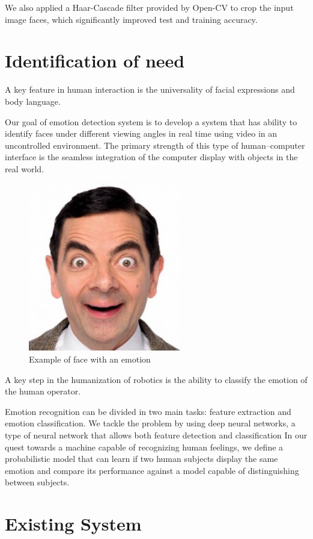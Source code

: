 We also applied a Haar-Cascade filter provided by Open-CV to crop the input image faces, which significantly improved test and training accuracy.

\section{Identification of need}
A key feature in human interaction is the universality of facial expressions and body language.

Our goal of emotion detection system is to develop a system that has ability to identify faces under different viewing angles in real time using video in an uncontrolled environment. The primary strength of this type of human–computer interface is the seamless integration of the computer display with objects in the real world.

\begin{figure}[h]
	\centering\includegraphics{images/mrbean.png}
	\caption{Example of face with an emotion}
\end{figure}

A key step in the humanization of robotics is the ability to classify the emotion of the human operator.

Emotion recognition can be divided in two main tasks: feature extraction and emotion classification. We tackle the problem by using deep neural networks, a type of neural network that allows both feature detection and classification In our quest towards a machine capable of recognizing human feelings, we define a probabilistic model that can learn if two human subjects display the same emotion and compare its performance against a model capable of distinguishing between subjects.

\section{Existing System}

